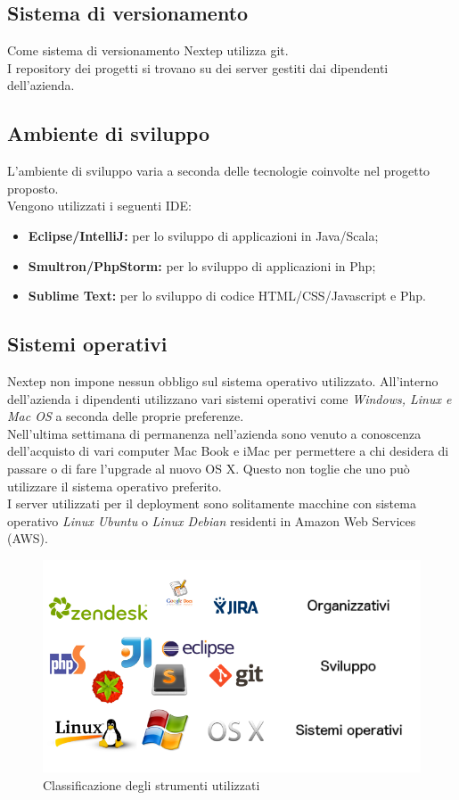 \subsection*{Sistema di versionamento}
Come sistema di versionamento Nextep utilizza \gls{git}.\\
I repository dei progetti si trovano su dei server gestiti dai dipendenti dell'azienda.

\subsection*{Ambiente di sviluppo}
L'ambiente di sviluppo varia a seconda delle tecnologie coinvolte nel progetto proposto.\\
Vengono utilizzati i seguenti \gls{IDE}:
\begin{itemize}
	\item \textbf{Eclipse/IntelliJ: }per lo sviluppo di applicazioni in Java/Scala;
	\item \textbf{Smultron/PhpStorm: }per lo sviluppo di applicazioni in Php;
	\item \textbf{Sublime Text: }per lo sviluppo di codice HTML/CSS/Javascript e Php.
\end{itemize}

\subsection*{Sistemi operativi}
Nextep non impone nessun obbligo sul sistema operativo utilizzato. All'interno dell'azienda i dipendenti utilizzano vari sistemi operativi come \textit{Windows, Linux e Mac OS} a seconda delle proprie preferenze.\\
Nell'ultima settimana di permanenza nell'azienda sono venuto a conoscenza dell'acquisto di vari computer Mac Book e iMac per permettere a chi desidera di passare o di fare l'upgrade al nuovo OS X. Questo non toglie che uno può utilizzare il sistema operativo preferito.\\
I server utilizzati per il deployment sono solitamente macchine con sistema operativo \textit{Linux Ubuntu} o \textit{Linux Debian} residenti in Amazon Web Services (AWS).

\begin{figure}[h]
\centering
\includegraphics[width=0.7\linewidth]{immagini/gestione}
\caption[Classificazione degli strumenti utilizzati]{Classificazione degli strumenti utilizzati}
\label{fig:gestione}
\end{figure}

